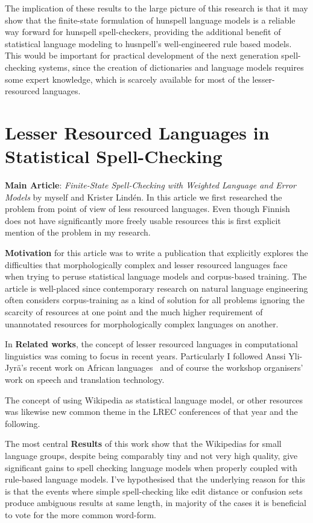 \documentclass[officiallayout,draft]{unihelcompling}
\begin{document}
The implication of these results to the large picture of this research is
that it may show that the finite-state formulation of hunspell language models
is a reliable way forward for hunspell spell-checkers, providing the additional
benefit of statistical language modeling to husnpell's well-engineered
rule based models. This would be important for practical development of
the next generation spell-checking systems, since the creation of dictionaries
and language models requires some expert knowledge, which is scarcely available
for most of the lesser-resourced languages.

\section{Lesser Resourced Languages in Statistical Spell-Checking}

\textbf{Main Article}: \emph{Finite-State Spell-Checking with Weighted Language
and Error Models} by myself and Krister Lindén. In this article we first
researched the problem from point of view of less resourced languages. Even
though Finnish does not have significantly more freely usable resources this
is first explicit mention of the problem in my research.

\textbf{Motivation} for this article was to write a publication that
explicitly explores the difficulties that morphologically complex and lesser
resourced languages face when trying to peruse statistical language models and
corpus-based training. The article is well-placed since contemporary research
on natural language engineering often considers corpus-training as a kind of
solution for all problems ignoring the scarcity of resources at one point and
the much higher requirement of unannotated resources for morphologically
complex languages on another.

In \textbf{Related works}, the concept of lesser resourced languages in
computational linguistics was coming to focus in recent years. Particularly I
followed Anssi Yli-Jyrä's recent work on African
languages~\cite{yli2005toward} and of course the workshop organisers' work on
speech and translation technology.

The concept of using Wikipedia as statistical language model, or other
resources was likewise new common theme in the LREC conferences of that
year and the following.

The most central \textbf{Results} of this work show that the Wikipedias for
small language groups, despite being comparably tiny and not very high quality,
give significant gains to spell checking language models when properly
coupled with rule-based language models. I've hypothesised that the underlying
reason for this is that the events where simple spell-checking like edit
distance or confusion sets produce ambiguous results at same length, in
majority of the cases it is beneficial to vote for the more common word-form.
\end{document}
